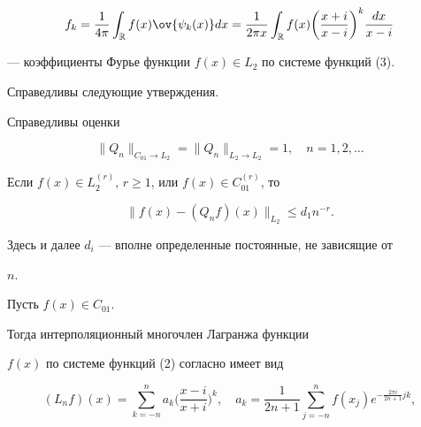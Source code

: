 \begin{equation} 


f_k=\frac{1}{4\pi}\int_{\Bbb R}f(x)\ov{\psi_k(x)}dx= 


\frac{1}{2\pi x}\int_{\Bbb R}f(x) 


\biggl(\frac{x+i}{x-i}\biggr)^k\frac{dx}{x-i} 


\end{equation} 


--- коэффициенты Фурье функции $f(x)\in L_2$ по системе функций (3). 


Справедливы следующие утверждения. 


 


\begin{thm} 


Справедливы оценки


$$ 


\|Q_n\|_{C_{01}\to L_2}=\|Q_n\|_{L_2\to L_2}=1,\quad 


n=1,2,\dotsc 


$$ 


\end{thm} 


 


\begin{thm} 


Если $f(x)\in L^{(r)}_2$, $r\ge 1$, или $f(x)\in C^{(r)}_{01}$, то 


$$ 


\|f(x)-(Q_n f)(x)\|_{L_2}\le d_1n^{-r}. 


$$ 


\end{thm} 


 


Здесь и далее $d_i$ --- вполне определенные постоянные, не зависящие от 


$n$. 


 


Пусть $f(x)\in C_{01}$. 


Тогда интерполяционный многочлен Лагранжа функции 


$f(x)$ по системе функций (2) согласно \cite{5} имеет вид 


\begin{equation} 


(L_n f)(x)=\sum^n_{k=-n}a_k 


\biggl(\frac{x-i}{x+i}\biggr)^k,\quad 


a_k=\frac{1}{2n+1}\sum^n_{j=-n} 


f(x_j)e^{-\frac{2\pi i}{2n+1}jk}, 


\end{equation} 


